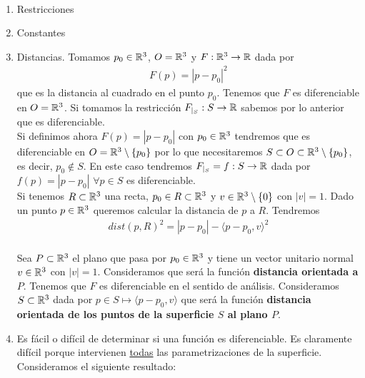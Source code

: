 \begin{ejemplo}\
    \begin{enumerate}
        \item Restricciones
        \item Constantes
        \item[$a_2$)] Distancias. Tomamos $p_0\in \mathbb{R}^3$, $O=\mathbb{R}^3$ y $F:\mathbb{R}^3 \to \mathbb{R}$ dada por 
        \begin{gather*}
            F(p) = |p-p_0|^2
        \end{gather*}
        que es la distancia al cuadrado en el punto $p_0$. Tenemos que $F$ es diferenciable en $O=\mathbb{R}^3$. Si tomamos la restricción $F_{|_S}:S \to \mathbb{R}$ sabemos por lo anterior que es diferenciable.\\

        Si definimos ahora $F(p)=|p-p_0|$ con $p_0\in \mathbb{R}^3$ tendremos que es diferenciable en $O = \mathbb{R}^3\setminus \{p_0\}$ por lo que necesitaremos $S\subset O \subset \mathbb{R}^3 \setminus \{p_0\}$, es decir, $p_0\notin S$. En este caso tendremos $F_{|_S}=f:S\to \mathbb{R}$ dada por $f(p)=|p-p_0|$ $\forall p \in S$ es diferenciable.\\

        Si tenemos $R\subset \mathbb{R}^3$ una recta, $p_0\in R\subset \mathbb{R}^3$ y $v\in \mathbb{R}^3\setminus\{0\}$ con $|v|=1$. Dado un punto $p\in \mathbb{R}^3$ queremos calcular la distancia de $p$ a $R$. Tendremos
        \begin{gather*}
            dist(p,R)^2 = |p-p_0| - \langle p-p_0, v \rangle^2
        \end{gather*}\\

        Sea $P\subset \mathbb{R}^3$ el plano que pasa por $p_0\in \mathbb{R}^3$ y tiene un vector unitario normal $v\in \mathbb{R}^3$ con $|v|=1$. Consideramos 
        \Func{F}{O=\bb{R}^3}{\bb{R}}{p}{F(p)=\langle p-p_0,v \rangle}
        que será la función \textbf{distancia orientada a $P$}. Tenemos que $F$ es diferenciable en el sentido de análisis. Consideramos $S\subset \mathbb{R}^3$ dada por $p\in S \mapsto \langle p-p_0, v\rangle$ que será la función \textbf{distancia orientada de los puntos de la superficie $S$ al plano $P$}.

        \item[a)] Es fácil o difícil de determinar si una función es diferenciable. Es claramente difícil porque intervienen \underline{todas} las parametrizaciones de la superficie. Consideramos el siguiente resultado:\\
        

\end{enumerate}
\end{ejemplo}
